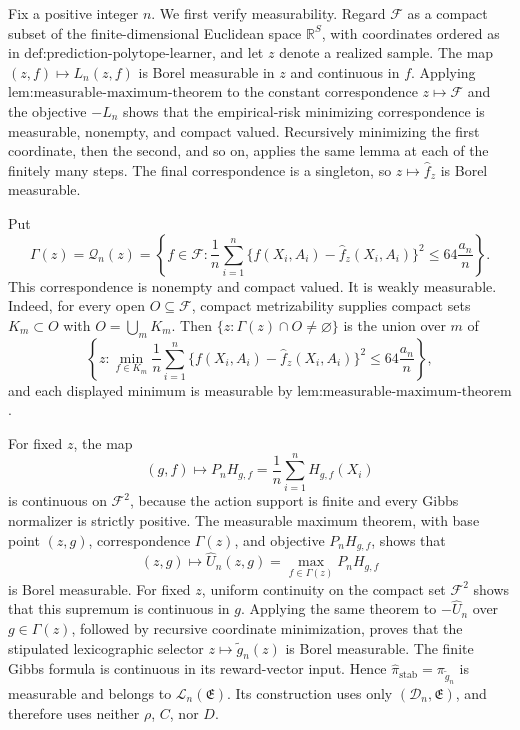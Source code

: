 Fix a positive integer \(n\). We first verify measurability. Regard \(\mathcal F\) as a compact subset of the finite-dimensional Euclidean space \(\mathbb R^S\), with coordinates ordered as in \(\text{def:prediction-polytope-learner}\), and let \(z\) denote a realized sample. The map \((z,f)\mapsto L_n(z,f)\) is Borel measurable in \(z\) and continuous in \(f\). Applying \(\text{lem:measurable-maximum-theorem}\) to the constant correspondence \(z\mapsto\mathcal F\) and the objective \(-L_n\) shows that the empirical-risk minimizing correspondence is measurable, nonempty, and compact valued. Recursively minimizing the first coordinate, then the second, and so on, applies the same lemma at each of the finitely many steps. The final correspondence is a singleton, so \(z\mapsto\widehat f_z\) is Borel measurable.

Put
\[
\Gamma(z)=\mathcal Q_n(z)=\left\{f\in\mathcal F:\frac1n\sum_{i=1}^n\{f(X_i,A_i)-\widehat f_z(X_i,A_i)\}^2\le64\frac{a_n}{n}\right\}.
\]
This correspondence is nonempty and compact valued. It is weakly measurable. Indeed, for every open \(O\subseteq\mathcal F\), compact metrizability supplies compact sets \(K_m\subset O\) with \(O=\bigcup_mK_m\). Then \(\{z:\Gamma(z)\cap O\ne\varnothing\}\) is the union over \(m\) of
\[
\left\{z:\min_{f\in K_m}\frac1n\sum_{i=1}^n\{f(X_i,A_i)-\widehat f_z(X_i,A_i)\}^2\le64\frac{a_n}{n}\right\},
\]
and each displayed minimum is measurable by \(\text{lem:measurable-maximum-theorem}\).

For fixed \(z\), the map
\[
(g,f)\longmapsto P_nH_{g,f}=\frac1n\sum_{i=1}^nH_{g,f}(X_i)
\]
is continuous on \(\mathcal F^2\), because the action support is finite and every Gibbs normalizer is strictly positive. The measurable maximum theorem, with base point \((z,g)\), correspondence \(\Gamma(z)\), and objective \(P_nH_{g,f}\), shows that
\[
(z,g)\longmapsto\widehat U_n(z,g)=\max_{f\in\Gamma(z)}P_nH_{g,f}
\]
is Borel measurable. For fixed \(z\), uniform continuity on the compact set \(\mathcal F^2\) shows that this supremum is continuous in \(g\). Applying the same theorem to \(-\widehat U_n\) over \(g\in\Gamma(z)\), followed by recursive coordinate minimization, proves that the stipulated lexicographic selector \(z\mapsto\widetilde g_n(z)\) is Borel measurable. The finite Gibbs formula is continuous in its reward-vector input. Hence \(\widehat\pi_{\mathrm{stab}}=\pi_{\widetilde g_n}\) is measurable and belongs to \(\mathcal L_n(\mathfrak E)\). Its construction uses only \((\mathcal D_n,\mathfrak E)\), and therefore uses neither \(\rho\), \(C\), nor \(D\).

